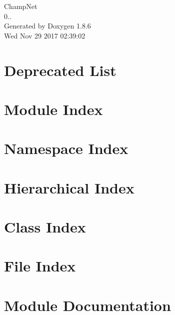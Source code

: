 \documentclass[twoside]{book}
\newcommand{\clearemptydoublepage}{%
  \newpage{\pagestyle{empty}\cleardoublepage}%
}
\begin{document}
\hypersetup{pageanchor=false}
\begin{titlepage}
\vspace*{7cm}
\begin{center}%
{\Large Champ\-Net \\[1ex]\large 0.. }\\
\vspace*{1cm}
{\large Generated by Doxygen 1.8.6}\\
\vspace*{0.5cm}
{\small Wed Nov 29 2017 02:39:02}\\
\end{center}
\end{titlepage}
\clearemptydoublepage
\tableofcontents
\clearemptydoublepage
{}
\hypersetup{pageanchor=true}

\chapter{Deprecated List}
\label{deprecated}
\hypertarget{deprecated}{}

\chapter{Module Index}

\chapter{Namespace Index}

\chapter{Hierarchical Index}

\chapter{Class Index}

\chapter{File Index}

\chapter{Module Documentation}


















\end{document}
